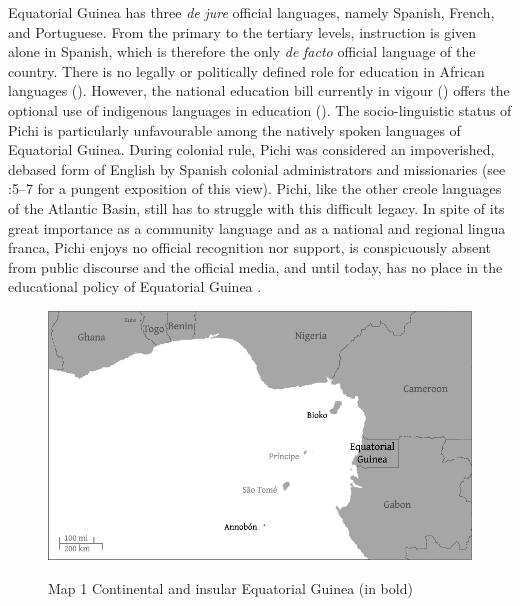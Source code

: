 Equatorial Guinea has three \textit{de} \textit{jure} official languages, namely Spanish, French, and Portuguese. From the primary to the tertiary levels, instruction is given alone in Spanish, which is therefore the only \textit{de} \textit{facto} official language of the country. There is no legally or politically defined role for education in African languages (\citealt{Yakpo2011,Yakpo2016estatuto}). However, the national education bill currently in vigour (\citealt{RepublicadeGuineaEcuatorial2007}) offers the optional use of indigenous languages in education (\citealt{OloFernandes2012}). The socio-linguistic status of Pichi is particularly unfavourable among the natively spoken languages of Equatorial Guinea. During colonial rule, Pichi was considered an impoverished, debased form of English by Spanish colonial administrators and missionaries (see \citealt{Zarco1938}:5–7 for a pungent exposition of this view). Pichi, like the other creole languages of the Atlantic Basin, still has to struggle with this difficult legacy. In spite of its great importance as a community language and as a national and regional lingua franca, Pichi enjoys no official recognition nor support, is conspicuously absent from public discourse and the official media, and until today, has no place in the educational policy of Equatorial Guinea \citep{Yakpo2016estatuto}.


\begin{figure}
	\caption{Map 1 Continental and insular Equatorial Guinea (in bold)}
	\includegraphics[width=\textwidth]{figures/yakpomod-img1.png}
	\label{map:1:1.1}
\end{figure}

